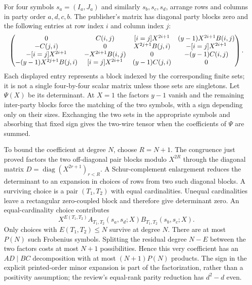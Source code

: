 \documentclass[11pt,letterpaper]{article}
\theoremstyle{definition}\newtheorem{definition}[theorem]{Definition}\newtheorem{example}[theorem]{Example}
\theoremstyle{remark}\newtheorem{remark}[theorem]{Remark}
\begin{document}
For four symbols $s_a=(I_a,J_a)$ and similarly $s_b,s_c,s_d$, arrange rows and columns in party order $a,d,c,b$. The publisher's matrix has diagonal party blocks zero and the following entries at row index $i$ and column index $j$:
\[
\resizebox{\linewidth}{!}{$\displaystyle
\begin{pmatrix}
0&C(i,j)&[i=j]X^{2i+1}&(y-1)X^{2i+1}B(i,j)\\
-C(j,i)&0&X^{2j+1}B(j,i)&-[i=j]X^{2i+1}\\
-[i=j]X^{2i+1}&-X^{2i+1}B(i,j)&0&-(y-1)C(i,j)\\
-(y-1)X^{2j+1}B(j,i)&[i=j]X^{2i+1}&(y-1)C(j,i)&0
\end{pmatrix}. $}
\]
Each displayed entry represents a block indexed by the corresponding finite sets; it is not a single four-by-four scalar matrix unless those sets are singletons. Let $\Psi(X)$ be its determinant. At $X=1$ the factors $y-1$ vanish and the remaining inter-party blocks force the matching of the two symbols, with a sign depending only on their sizes. Exchanging the two sets in the appropriate symbols and absorbing that fixed sign gives the two-wire tensor when the coefficients of $\Psi$ are summed.

To bound the coefficient at degree $N$, choose $R=N+1$. The congruence just proved factors the two off-diagonal pair blocks modulo $X^{2R}$ through the diagonal matrix $D=\operatorname{diag}(X^{2r+1})_{r<R}$. A Schur-complement enlargement reduces the determinant to an expansion in choices of rows from two such diagonal blocks. A surviving choice is a pair $(T_1,T_2)$ with equal cardinalities. Unequal cardinalities leave a rectangular zero-coupled block and therefore give determinant zero. An equal-cardinality choice contributes
\[
 X^{E(T_1,T_2)} A_{T_1,T_2}(s_a,s_d;X)
                         B_{T_1,T_2}(s_b,s_c;X).
\]
Only choices with $E(T_1,T_2)\le N$ survive at degree $N$. There are at most $P(N)$ such Frobenius symbols. Splitting the residual degree $N-E$ between the two factors costs at most $N+1$ possibilities. Hence this very coefficient has an $AD\mid BC$ decomposition with at most $(N+1)P(N)$ products. The sign in the explicit printed-order minor expansion is part of the factorization, rather than a positivity assumption; the review's equal-rank parity reduction has $d^2-d$ even.
\end{document}
